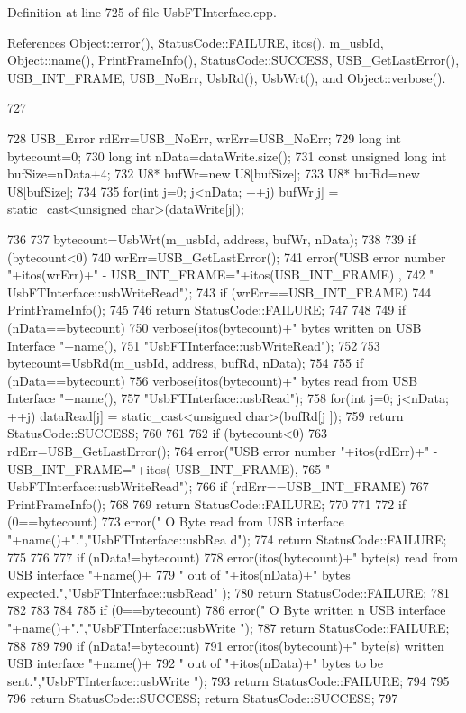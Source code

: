 Definition at line 725 of file UsbFTInterface.cpp.

References Object::error(), StatusCode::FAILURE, itos(), m\_\-usbId, Object::name(), PrintFrameInfo(), StatusCode::SUCCESS, USB\_\-GetLastError(), USB\_\-INT\_\-FRAME, USB\_\-NoErr, UsbRd(), UsbWrt(), and Object::verbose().


\begin{DoxyCode}
727                                                                     {
728   USB_Error rdErr=USB_NoErr, wrErr=USB_NoErr;
729   long int bytecount=0;
730   long int nData=dataWrite.size();
731   const unsigned long int bufSize=nData+4;
732   U8* bufWr=new U8[bufSize];
733   U8* bufRd=new U8[bufSize];
734 
735   for(int j=0; j<nData; ++j) bufWr[j] = static_cast<unsigned char>(dataWrite[j]);
      
736 
737   bytecount=UsbWrt(m_usbId, address, bufWr, nData);
738 
739   if (bytecount<0){
740     wrErr=USB_GetLastError();
741     error("USB error number "+itos(wrErr)+" - USB_INT_FRAME="+itos(USB_INT_FRAME)
      ,
742             " UsbFTInterface::usbWriteRead");
743     if (wrErr==USB_INT_FRAME){
744       PrintFrameInfo();
745     } 
746     return StatusCode::FAILURE;
747   }
748 
749   if (nData==bytecount){
750     verbose(itos(bytecount)+" bytes written on USB Interface "+name(),
751             "UsbFTInterface::usbWriteRead");
752 
753     bytecount=UsbRd(m_usbId, address, bufRd, nData);
754 
755     if (nData==bytecount){
756       verbose(itos(bytecount)+" bytes read from USB Interface "+name(),
757               "UsbFTInterface::usbRead");
758       for(int j=0; j<nData; ++j) dataRead[j] = static_cast<unsigned char>(bufRd[j
      ]);
759       return StatusCode::SUCCESS;
760     }
761 
762     if (bytecount<0){
763       rdErr=USB_GetLastError();
764       error("USB error number "+itos(rdErr)+" - USB_INT_FRAME="+itos(
      USB_INT_FRAME),
765               " UsbFTInterface::usbWriteRead");
766       if (rdErr==USB_INT_FRAME){
767         PrintFrameInfo();
768       } 
769       return StatusCode::FAILURE;
770     }
771   
772     if (0==bytecount){
773       error(" O Byte read from USB interface "+name()+".","UsbFTInterface::usbRea
      d");
774       return StatusCode::FAILURE;
775     }
776 
777     if (nData!=bytecount){
778       error(itos(bytecount)+" byte(s) read from USB interface "+name()+
779               " out of "+itos(nData)+" bytes expected.","UsbFTInterface::usbRead"
      );
780       return StatusCode::FAILURE;    
781     } 
782   }
783   
784   
785   if (0==bytecount){
786     error(" O Byte written n USB interface "+name()+".","UsbFTInterface::usbWrite
      ");
787     return StatusCode::FAILURE;
788   }
789 
790   if (nData!=bytecount){
791     error(itos(bytecount)+" byte(s) written USB interface "+name()+
792             " out of "+itos(nData)+" bytes to be sent.","UsbFTInterface::usbWrite
      ");
793     return StatusCode::FAILURE;    
794   }
795 
796   return StatusCode::SUCCESS;    return StatusCode::SUCCESS;  
797 }
\end{DoxyCode}
